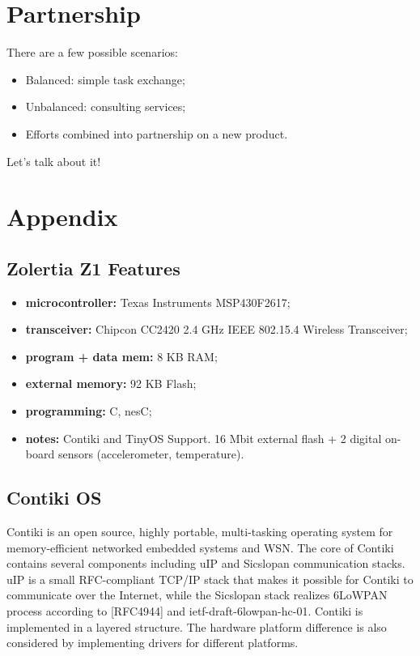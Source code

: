 \documentclass[10pt]{article}
\begin{document}
\section{Partnership}
There are a few possible scenarios:
\begin{itemize}
  \item Balanced: simple task exchange;
  \item Unbalanced: consulting services;
  \item Efforts combined into partnership on a new product.
\end{itemize}
Let's talk about it!

\section{Appendix}

\subsection{Zolertia Z1 Features}
\label{sec:z1-feats}
\begin{itemize}
  \item \textbf{microcontroller:} Texas Instruments MSP430F2617;
  \item \textbf{transceiver:} Chipcon CC2420 2.4 GHz IEEE 802.15.4 Wireless Transceiver;
  \item \textbf{program + data mem:} 8 KB RAM;
  \item \textbf{external memory:} 92 KB Flash;
  \item \textbf{programming:} C, nesC;
  \item \textbf{notes:} Contiki and TinyOS Support. 16 Mbit external flash + 2 digital on-board sensors (accelerometer, temperature).
\end{itemize}

\subsection{Contiki OS}
Contiki is an open source, highly portable, multi-tasking operating system for memory-efficient networked embedded systems and WSN.  The core of Contiki contains several components including uIP and Sicslopan communication stacks. uIP is a small RFC-compliant TCP/IP stack that makes it possible for Contiki to communicate over the Internet, while the Sicslopan stack realizes 6LoWPAN process according to [RFC4944] and ietf-draft-6lowpan-hc-01.  Contiki is implemented in a layered structure.  The hardware platform difference is also considered by implementing drivers for different platforms.  
\end{document}
